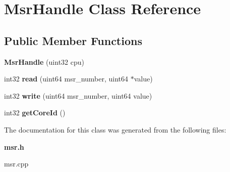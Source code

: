 \section{Msr\+Handle Class Reference}
\label{classMsrHandle}
\subsection*{Public Member Functions}
\begin{DoxyCompactItemize}
\item 
\mbox{\label{classMsrHandle_a481b0c81ad8f00d9d69db660e793a135}} 
{\bfseries Msr\+Handle} (uint32 cpu)
\item 
\mbox{\label{classMsrHandle_a9a7723baaa1ec91a8303b5ef6579c1df}} 
int32 {\bfseries read} (uint64 msr\+\_\+number, uint64 $\ast$value)
\item 
\mbox{\label{classMsrHandle_aa92da3c093ca1473eb7a7cad86f24c89}} 
int32 {\bfseries write} (uint64 msr\+\_\+number, uint64 value)
\item 
\mbox{\label{classMsrHandle_adbbfac37adfdd3fb571b5a6978f60419}} 
int32 {\bfseries get\+Core\+Id} ()
\end{DoxyCompactItemize}


The documentation for this class was generated from the following files\+:\begin{DoxyCompactItemize}
\item 
\textbf{ msr.\+h}\item 
msr.\+cpp\end{DoxyCompactItemize}
